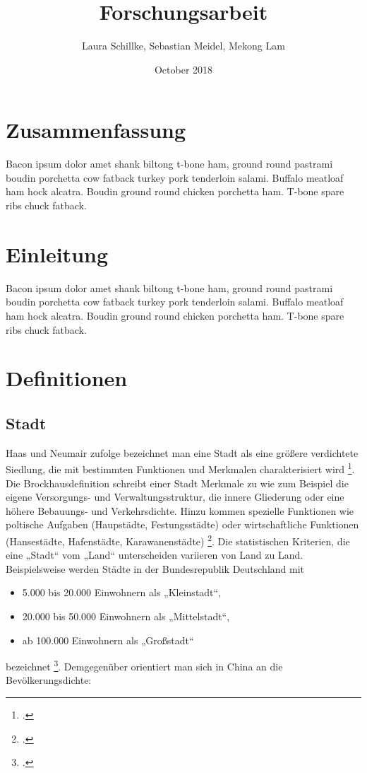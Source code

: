\documentclass{article}
\title{Forschungsarbeit}
\author{Laura Schillke, Sebastian Meidel, Mekong Lam }
\date{October 2018}
\begin{document}
\maketitle


\newpage

\setcounter{tocdepth}{3}
\tableofcontents 



\newpage

\section{Zusammenfassung}
Bacon ipsum dolor amet shank biltong t-bone ham, ground round pastrami boudin porchetta cow fatback turkey pork tenderloin salami. Buffalo meatloaf ham hock alcatra. Boudin ground round chicken porchetta ham. T-bone spare ribs chuck fatback.

\section{Einleitung}
Bacon ipsum dolor amet shank biltong t-bone ham, ground round pastrami boudin porchetta cow fatback turkey pork tenderloin salami. Buffalo meatloaf ham hock alcatra. Boudin ground round chicken porchetta ham. T-bone spare ribs chuck fatback.


\section{Definitionen}

\subsection{Stadt}

Haas und Neumair zufolge bezeichnet man eine Stadt als eine größere verdichtete Siedlung, die mit bestimmten Funktionen und Merkmalen charakterisiert wird \footcite{HaasDefinitionWirtschaftslexikon}. Die Brockhausdefinition schreibt einer Stadt Merkmale zu wie zum Beispiel die eigene Versorgungs- und Verwaltungsstruktur, die innere Gliederung oder eine höhere Bebauungs- und Verkehrsdichte. Hinzu kommen spezielle Funktionen wie poltische Aufgaben (Haupstädte, Festungsstädte) oder wirtschaftliche Funktionen (Hansestädte, Hafenstädte, Karawanenstädte) \footcite{BrockhausStadt}. Die statistischen Kriterien, die eine „Stadt“ vom „Land“ unterscheiden variieren von Land zu Land. Beispielsweise werden Städte in der Bundesrepublik Deutschland mit 
\begin{itemize}
\item 5.000 bis 20.000 Einwohnern als „Kleinstadt“,
\item 20.000 bis 50.000 Einwohnern als „Mittelstadt“,
\item ab 100.000 Einwohnern als „Großstadt“ 
\end{itemize}
bezeichnet \footcite{Institutinternationaldestatistique1887BulletinStatistique}. Demgegenüber orientiert man sich in China an die Bevölkerungsdichte: 
\end{document}

